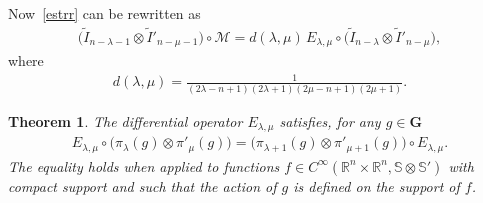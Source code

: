\documentclass[10pt,a4paper]{amsart}
\numberwithin{equation}{section}
\newtheorem{theor}{Theorem}[section]
\begin{document}
 Now~\eqref{estrr} can be rewritten as
\begin{gather*}
\big(\widetilde I_{n-\lambda-1} \otimes \widetilde I'_{n-\mu-1}\big) \circ \mathcal{M} = d(\lambda, \mu)\, E_{\lambda, \mu}\circ \big(\widetilde I_{n-\lambda}\otimes \widetilde I'_{n-\mu}\big),
\end{gather*}
where
\begin{gather*}
d(\lambda, \mu) = \frac{1}{(2\lambda-n+1)(2\lambda+1)(2\mu-n+1)(2\mu+1)}.
\end{gather*}
\begin{theor}\label{covE1th}
 The differential operator $E_{\lambda,\mu}$ satisfies, for any $g\in \mathbf G$
\begin{gather*}\label{covE1}
 E_{\lambda,\mu} \circ \big(\pi_\lambda(g) \otimes \pi'_\mu(g)\big)=\big( \pi_{\lambda+1}(g)\otimes \pi'_{\mu+1}(g)\big)\circ E_{\lambda,\mu}.
\end{gather*}
The equality holds when applied to functions $f \in C^\infty(\mathbb R^n \times \mathbb R^n, \mathbb S \otimes \mathbb S')$ with compact support and such that the action of $g$ is defined on the support of $f$.
\end{theor}
\end{document}
